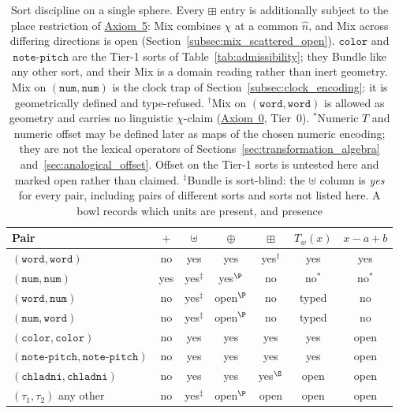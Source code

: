 \documentclass[12pt, a4paper]{article}
\begin{document}
\begin{table}[h]
\centering
\begin{tabular}{lcccccc}
\hline
Pair & $+$ & $\uplus$ & $\oplus$ & $\boxplus$ & $T_w(x)$ & $x-a+b$ \\
\hline
$(\mathtt{word},\mathtt{word})$ & no & yes & yes & yes$^{\dagger}$ & yes & yes \\
$(\mathtt{num},\mathtt{num})$   & yes & yes$^{\ddagger}$ & yes$^{\P}$ & no  & no$^{*}$ & no$^{*}$ \\
$(\mathtt{word},\mathtt{num})$  & no & yes$^{\ddagger}$ & open$^{\P}$ & no & typed & no \\
$(\mathtt{num},\mathtt{word})$  & no & yes$^{\ddagger}$ & open$^{\P}$ & no & typed & no \\
$(\mathtt{color},\mathtt{color})$ & no & yes & yes & yes & yes & open \\
$(\mathtt{note\text{-}pitch},\mathtt{note\text{-}pitch})$ & no & yes & yes & yes & yes & open \\
$(\mathtt{chladni},\mathtt{chladni})$ & no & yes & yes & yes$^{\S}$ & open & open \\
$(\tau_1,\tau_2)$ any other & no & yes$^{\ddagger}$ & open$^{\P}$ & open & open & open \\
\hline
\end{tabular}
\caption{Sort discipline on a single sphere. Every $\boxplus$ entry is
additionally subject to the place restriction of
\hyperref[subsec:axiom_interference]{Axiom~5}: Mix combines $\chi$ at a common
$\hat n$, and Mix across differing directions is open
(Section~\ref{subsec:mix_scattered_open}).
$\mathtt{color}$ and $\mathtt{note\text{-}pitch}$ are the Tier-1 sorts of
Table~\ref{tab:admissibility}; they Bundle like any other sort, and
their Mix is a domain reading rather than inert geometry.
Mix on $(\mathtt{num},\mathtt{num})$ is the clock trap of
Section~\ref{subsec:clock_encoding}: it is geometrically defined and
type-refused. $^{\dagger}$Mix on $(\mathtt{word},\mathtt{word})$ is
allowed as geometry and carries no linguistic $\chi$-claim
(\hyperref[subsec:axiom0_admissibility]{Axiom~0}, Tier~0).
$^{*}$Numeric $T$ and numeric offset may be defined later as
maps of the chosen numeric encoding; they are not the lexical
operators of Sections~\ref{sec:transformation_algebra}
and~\ref{sec:analogical_offset}. Offset on the Tier-1 sorts is
untested here and marked open rather than claimed.
$^{\ddagger}$Bundle is sort-blind: the $\uplus$ column is \emph{yes}
for every pair, including pairs of different sorts and sorts not
listed here. A bowl records which units are present, and presence
}
\end{table}
\end{document}
